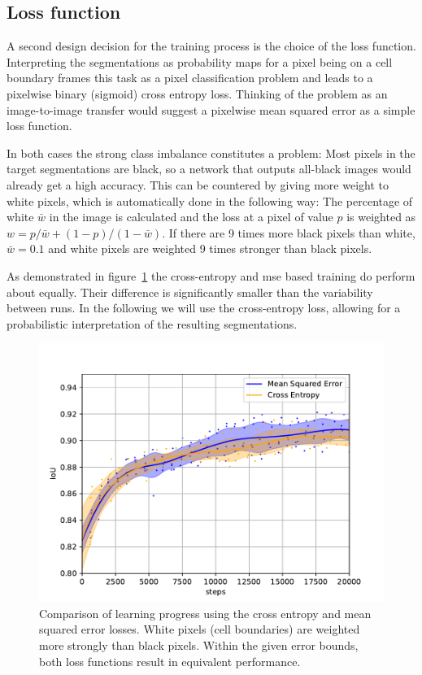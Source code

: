 \documentclass[aps,prl,twocolumn,groupedaddress,amsmath,amssymb]{revtex4-1}
\begin{document}
    \subsection{Loss function}
    A second design decision for the training process is the choice of the loss function. 
    Interpreting the segmentations as probability maps for a pixel being on a cell boundary frames
    this task as a pixel classification problem and leads to a pixelwise binary (sigmoid) cross 
    entropy loss. Thinking of the problem as an image-to-image transfer would suggest a pixelwise
    mean squared error as a simple loss function. 

    In both cases the strong class imbalance constitutes a problem: Most pixels in the target 
    segmentations are black, so a network that outputs all-black images would already get a high 
    accuracy. This can be countered by giving more weight to white pixels, which is automatically 
    done in the following way: The percentage of white $\bar{w}$ in the image is calculated 
    and the loss at a pixel of value $p$ is weighted as $w = p/\bar{w} + (1-p)/(1-\bar{w})$. If there
    are 9 times more black pixels than white, $\bar{w}=0.1$ and white pixels are weighted 9 times 
    stronger than black pixels.

    As demonstrated in figure~\ref{fig:mse} the cross-entropy and mse based training do perform
    about equally. Their difference is significantly smaller than the variability between runs. In
    the following we will use the cross-entropy loss, allowing for a probabilistic interpretation
    of the resulting segmentations.

    \begin{figure}[tbp]
        \begin{center}
        \includegraphics[width=\linewidth]{figures/mse.pdf}
        \end{center}
        \caption{Comparison of learning progress using the cross entropy and mean squared error 
        losses. White pixels (cell boundaries) are weighted more strongly than black pixels. 
        Within the given error bounds, both loss functions result in equivalent performance.}
        \label{fig:mse}
    \end{figure}
\end{document}
